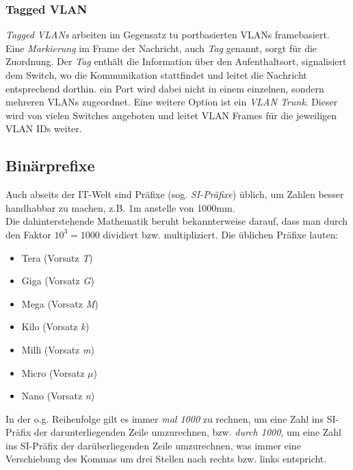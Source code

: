 \documentclass[a4paper, 12pt]{report}
\begin{document}
\begin{multicols}{2}
\subsubsection{Tagged VLAN}
\emph{Tagged VLANs} arbeiten im Gegensatz tu portbasierten VLANs framebasiert.
Eine \emph{Markierung} im Frame der Nachricht, auch \emph{Tag} genannt, sorgt
für die Zuordnung. Der \emph{Tag} enthält die Information über den
Aufenthaltsort, signalisiert dem Switch, wo die Kommunikation stattfindet und
leitet die Nachricht entsprechend dorthin. ein Port wird dabei nicht in einem
einzelnen, sondern mehreren VLANs zugeordnet. Eine weitere Option ist ein
\emph{VLAN Trunk}. Dieser wird von vielen Switches angeboten und leitet VLAN
Frames für die jeweiligen VLAN IDs weiter.

\subsection{Binärprefixe}

Auch abseits der IT-Welt sind Präfixe (sog. \emph{SI-Präfixe}) üblich, um Zahlen
besser handhabbar zu machen, z.B. 1m anstelle von 1000mm. \\

Die dahinterstehende Mathematik beruht bekannterweise darauf, dass man durch
den Faktor $10^3 = 1000$ dividiert bzw. multipliziert. Die üblichen Präfixe
lauten:

\begin{itemize}
    \item Tera (Vorsatz \emph{T})
    \item Giga (Vorsatz \emph{G})
    \item Mega (Vorsatz \emph{M})
    \item Kilo (Vorsatz \emph{k})
    \item Milli (Vorsatz \emph{m})
    \item Micro (Vorsatz \emph{$\mu$})
    \item Nano (Vorsatz \emph{n})
\end{itemize}

In der o.g. Reihenfolge gilt es immer \emph{\glqq mal 1000\grqq{}} zu rechnen,
um eine Zahl ins SI-Präfix der darunterliegenden Zeile umzurechnen, bzw.
\emph{\glqq durch 1000\grqq{}}, um eine Zahl ins SI-Präfix der darüberliegenden
Zeile umzurechnen, was immer eine Verschiebung des Kommas um drei Stellen nach
rechts bzw. links entspricht. \\


\end{multicols}
\end{document}
